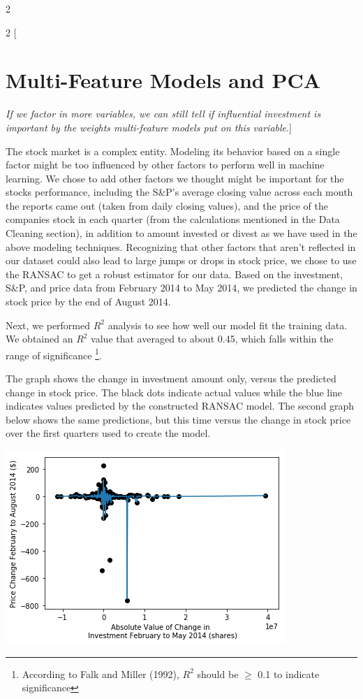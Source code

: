 \documentclass{article}
\begin{document}
\begin{multicols}{2}
\end{multicols}

\begin{multicols}{2}
[\section*{Multi-Feature Models and PCA} \textit{If we factor in more variables, we can still tell if influential investment is important by the weights multi-feature models put on this variable}.]

The stock market is a complex entity. Modeling its behavior based on a single factor might be too influenced by other factors to perform well in machine learning. We chose to add other factors we thought might be important for the stocks performance, including the S\&P's average closing value across each month the reports came out (taken from daily closing values), and the price of the companies stock in each quarter (from the calculations mentioned in the Data Cleaning section), in addition to amount invested or divest as we have used in the above modeling techniques. Recognizing that other factors that aren't reflected in our dataset could also lead to large jumps or drops in stock price, we chose to use the RANSAC to get a robust estimator for our data. Based on the investment, S\&P, and price data from February 2014 to May 2014, we predicted the change in stock price by the end of August 2014. 

Next, we performed $R^{2}$ analysis to see how well our model fit the training data. We obtained an $R^{2}$ value that averaged to about 0.45, which falls within the range of significance \footnote{According to Falk and Miller (1992), $R^{2}$ should be $\geq$  0.1 to indicate significance}. 

The graph shows the change in investment amount only, versus the predicted change in stock price. The black dots indicate actual values while the blue line indicates values predicted by the constructed RANSAC model. The second graph below shows the same predictions, but this time versus the change in stock price over the first quarters used to create the model.
\begin{center}
\includegraphics[scale = 0.43]{RansacTrainByAmt.png}
\end{center}


\end{multicols}
\end{document}
